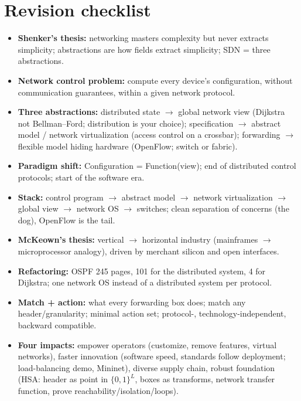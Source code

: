\section{Revision checklist}
\begin{itemize}
\item \textbf{Shenker's thesis:} networking masters complexity but never extracts simplicity; abstractions are how fields extract simplicity; SDN = three abstractions.
\item \textbf{Network control problem:} compute every device's configuration, without communication guarantees, within a given network protocol.
\item \textbf{Three abstractions:} distributed state $\to$ global network view (Dijkstra not Bellman--Ford; distribution is your choice); specification $\to$ abstract model / network virtualization (access control on a crossbar); forwarding $\to$ flexible model hiding hardware (OpenFlow; switch or fabric).
\item \textbf{Paradigm shift:} Configuration = Function(view); end of distributed control protocols; start of the software era.
\item \textbf{Stack:} control program $\to$ abstract model $\to$ network virtualization $\to$ global view $\to$ network OS $\to$ switches; clean separation of concerns (the dog), OpenFlow is the tail.
\item \textbf{McKeown's thesis:} vertical $\to$ horizontal industry (mainframes $\to$ microprocessor analogy), driven by merchant silicon and open interfaces.
\item \textbf{Refactoring:} OSPF 245 pages, 101 for the distributed system, 4 for Dijkstra; one network OS instead of a distributed system per protocol.
\item \textbf{Match + action:} what every forwarding box does; match any header/granularity; minimal action set; protocol-, technology-independent, backward compatible.
\item \textbf{Four impacts:} empower operators (customize, remove features, virtual networks), faster innovation (software speed, standards follow deployment; load-balancing demo, Mininet), diverse supply chain, robust foundation (HSA: header as point in $\{0,1\}^L$, boxes as transforms, network transfer function, prove reachability/isolation/loops).
\end{itemize}
